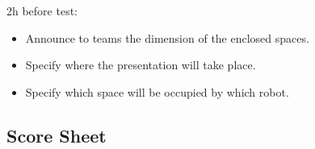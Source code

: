 2h before test:
\begin{itemize}
\item{Announce to teams the dimension of the enclosed spaces.}
\item{Specify where the presentation will take place.}
\item{Specify which space will be occupied by which robot.}
\end{itemize}

\subsection{Score Sheet}



